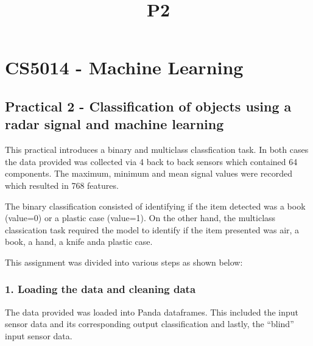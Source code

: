 \documentclass[11pt]{article}
\title{P2}
\begin{document}
    
    
    \maketitle
    
    

    
    \hypertarget{cs5014---machine-learning}{%
\section{CS5014 - Machine Learning}\label{cs5014---machine-learning}}

\hypertarget{practical-2---classification-of-objects-using-a-radar-signal-and-machine-learning}{%
\subsection{Practical 2 - Classification of objects using a radar signal
and machine
learning}\label{practical-2---classification-of-objects-using-a-radar-signal-and-machine-learning}}

This practical introduces a binary and multiclass classfication task. In
both cases the data provided was collected via 4 back to back sensors
which contained 64 components. The maximum, minimum and mean signal
values were recorded which resulted in 768 features.

The binary classification consisted of identifying if the item detected
was a book (value=0) or a plastic case (value=1). On the other hand, the
multiclass classication task required the model to identify if the item
presented was air, a book, a hand, a knife anda plastic case.

This assignment was divided into various steps as shown below:

    \hypertarget{loading-the-data-and-cleaning-data}{%
\subsubsection{1. Loading the data and cleaning
data}\label{loading-the-data-and-cleaning-data}}

The data provided was loaded into Panda dataframes. This included the
input sensor data and its corresponding output classification and
lastly, the ``blind'' input sensor data.
\end{document}

